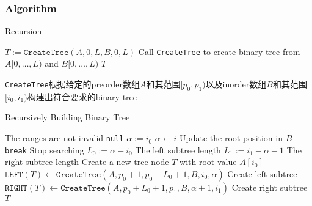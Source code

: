 \subsubsection{Algorithm}
\setcounter{algorithm}{0}
\begin{algorithm}[H]
\caption{Recursion}
\begin{algorithmic}[1]
\State $T:=\texttt{CreateTree}(A, 0, L, B, 0, L)$ \Comment Call \texttt{CreateTree} to create binary tree from $A[0,\ldots, L)$ and $B[0,\ldots,L)$
\State \Return $T$
\EndProcedure
\end{algorithmic}
\end{algorithm}
\begin{CJK*}{UTF8}{gbsn}
\texttt{CreateTree}根据给定的preorder数组$A$和其范围$[p_0, p_1)$以及inorder数组$B$和其范围$[i_0, i_1)$构建出符合要求的binary tree
\end{CJK*}
\begin{algorithm}[H]
\caption{Recursively Building Binary Tree}
\begin{algorithmic}[1]
 \Comment The ranges are not invalid
\State \Return \texttt{null}
\EndIf
\State $\alpha:=i_0$
\State $\alpha\gets i$ \Comment Update the root position in $B$
\State \texttt{break} \Comment Stop searching
\EndIf
\EndFor
\State $L_0:=\alpha - i_0$ \Comment The left subtree length
\State $L_1:=i_1 - \alpha - 1$ \Comment The right subtree length
\State Create a new tree node $T$ with root value $A[i_0]$
\State $\texttt{LEFT}(T)\gets \texttt{CreateTree}(A, p_0+1, p_0+L_0+1, B, i_0, \alpha)$ \Comment Create left subtree
\State $\texttt{RIGHT}(T) \gets \texttt{CreateTree}(A, p_0+L_0+1, p_1, B, \alpha+1, i_1)$ \Comment Create right subtree
\State \Return $T$
\EndFunction
\end{algorithmic}
\end{algorithm}